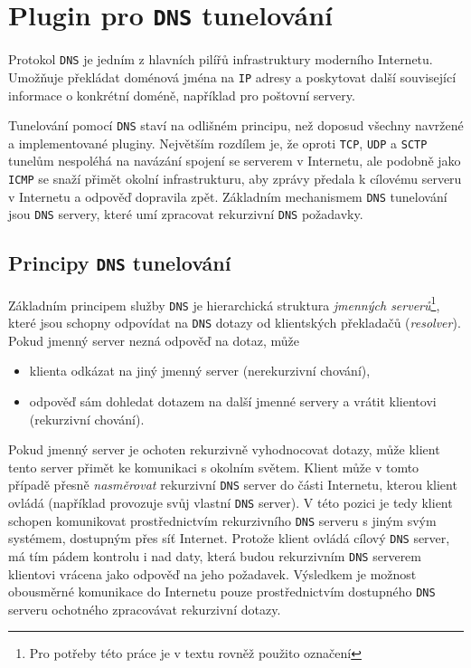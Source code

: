 \documentclass[thesis=M,czech]{FITthesis}[2012/10/20]
\begin{document}
    \clearpage
    
\section{Plugin pro \texttt{DNS} tunelování}
\label{sec:dns-tunnel}
    
    Protokol \texttt{DNS} je jedním z hlavních pilířů infrastruktury moderního Internetu. Umožňuje překládat doménová jména na \texttt{IP} adresy a poskytovat další související informace o konkrétní doméně, například pro poštovní servery.
    
    Tunelování pomocí \texttt{DNS} staví na odlišném principu, než doposud všechny navržené a implementované pluginy. Největším rozdílem je, že oproti \texttt{TCP}, \texttt{UDP} a \texttt{SCTP} tunelům nespoléhá na navázání spojení se serverem v Internetu, ale podobně jako \texttt{ICMP} se snaží přimět okolní infrastrukturu, aby zprávy předala k cílovému serveru v Internetu a odpověď dopravila zpět. Základním mechanismem \texttt{DNS} tunelování jsou \texttt{DNS} servery, které umí zpracovat rekurzivní \texttt{DNS} požadavky.
    
    \subsection{Principy \texttt{DNS} tunelování}
    
    Základním principem služby \texttt{DNS} je hierarchická struktura \textit{jmenných serverů}\footnote{Pro potřeby této práce je v textu rovněž použito označení }, které jsou schopny odpovídat na \texttt{DNS} dotazy od klientských překladačů (\textit{resolver}). Pokud jmenný server nezná odpověď na dotaz, může
    
    \begin{itemize}
     \item klienta odkázat na jiný jmenný server (nerekurzivní chování),
     \item odpověď sám dohledat dotazem na další jmenné servery a vrátit klientovi (rekurzivní chování).
    \end{itemize}
    
    Pokud jmenný server je ochoten rekurzivně vyhodnocovat dotazy, může klient tento server přimět ke komunikaci s okolním světem. Klient může v tomto případě přesně \textit{nasměrovat} rekurzivní \texttt{DNS} server do části Internetu, kterou klient ovládá (například provozuje svůj vlastní \texttt{DNS} server). V této pozici je tedy klient schopen komunikovat prostřednictvím rekurzivního \texttt{DNS} serveru s jiným svým systémem, dostupným přes síť Internet. Protože klient ovládá cílový \texttt{DNS} server, má tím pádem kontrolu i nad daty, která budou rekurzivním \texttt{DNS} serverem klientovi vrácena jako odpověď na jeho požadavek. Výsledkem je možnost obousměrné komunikace do Internetu pouze prostřednictvím dostupného \texttt{DNS} serveru ochotného zpracovávat rekurzivní dotazy.
\end{document}
